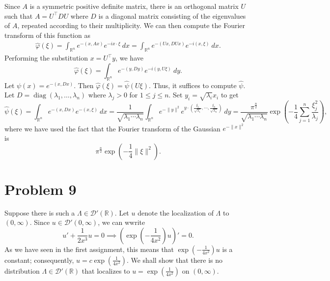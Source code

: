 \documentclass[10pt]{amsart}
\theoremstyle{thmstyle}
\theoremstyle{defstyle}
\newcommand{\R}{\mathbb{R}}
\newcommand{\wh}[1]{\widehat{#1}}
\renewcommand{\le}{\leqslant}
\begin{document}
Since $A$ is a symmetric positive definite matrix, there is an orthogonal matrix $U$ such that $A = U^\top D U$ where $D$ is a diagonal matrix consisting of the eigenvalues of $A$, repeated according to their multiplicity. We can then compute the Fourier transform of this function as 
\begin{align*}
    \wh\varphi(\xi) = \int_{\R^n} e^{-(x, Ax)}e^{-ix\cdot\xi}~dx = \int_{\R^n} e^{-(Ux, DUx)}e^{-i(x,\xi)}~dx.
\end{align*}
Performing the substitution $x = U^\top y$, we have 
\begin{equation*}
    \wh\varphi(\xi) = \int_{\R^n} e^{-(y, Dy)} e^{-i(y, U\xi)}~dy.
\end{equation*}
Let $\psi(x) = e^{-(x, Dx)}$. Then $\wh\varphi(\xi) = \wh\psi(U\xi)$. Thus, it suffices to compute $\wh\psi$. Let $D = \operatorname{diag}(\lambda_1,\dots,\lambda_n)$ where $\lambda_j > 0$ for $1\le j\le n$. Set $y_i = \sqrt{\lambda_i}x_i$ to get 
\begin{equation*}
    \wh\psi(\xi) = \int_{\R^n} e^{-(x, Dx)}e^{-(x, \xi)}~dx = \frac{1}{\sqrt{\lambda_1\cdots\lambda_n}}\int_{\R^n} e^{-\|y\|^2} e^{y\cdot\left(\frac{\xi_1}{\sqrt{\lambda_1}},\cdots,\frac{\xi_n}{\sqrt{\lambda_n}}\right)}~dy = \frac{\pi^{\frac{n}{2}}}{\sqrt{\lambda_1\cdots\lambda_n}}\exp\left(-\frac{1}{4}\sum_{j = 1}^n\frac{\xi_j^2}{\lambda_j}\right),
\end{equation*}
where we have used the fact that the Fourier transform of the Gaussian $e^{-\|x\|^2}$ is 
\begin{equation*}
    \pi^{\frac{n}{2}}\exp\left(-\frac{1}{4}\|\xi\|^2\right).
\end{equation*}

\section{Problem 9}

Suppose there is such a $\Lambda\in\mathscr D'(\R)$. Let $u$ denote the localization of $\Lambda$ to $(0,\infty)$. Since $u\in\mathscr D'(0,\infty)$, we can wwrite 
\begin{equation*}
    u' + \frac{1}{2x^3}u = 0\implies \left(\exp\left(-\frac{1}{4x^2}\right)u\right)' = 0.
\end{equation*}
As we have seen in the first assignment, this means that $\exp\left(-\frac{1}{4x^2}\right)u$ is a constant; consequently, $u = c\exp\left(\frac{1}{4x^2}\right)$. We shall show that there is no distribution $\Lambda\in\mathscr D'(\R)$ that localizes to $u = \exp\left(\frac{1}{4x^2}\right)$ on $(0, \infty)$.
\end{document}
